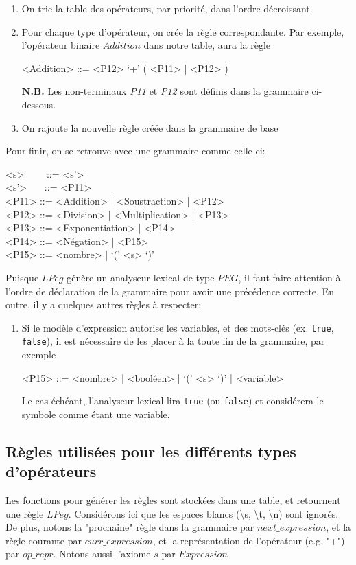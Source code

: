 \documentclass{article}
\begin{document}
\begin{enumerate}
	\item On trie la table des opérateurs, par priorité, dans l'ordre décroissant.
	\item Pour chaque type d'opérateur, on crée la règle correspondante. Par exemple, l'opérateur binaire $Addition$ dans notre table, aura la règle
	\begin{grammar}
		<Addition> ::= <P12> `+' ( <P11> | <P12> )
	\end{grammar}
	\textbf{N.B.} Les non-terminaux \textit{P11} et \textit{P12} sont définis dans la grammaire ci-dessous.
	\item On rajoute la nouvelle règle créée dans la grammaire de base
\end{enumerate}
Pour finir, on se retrouve avec une grammaire comme celle-ci:
\begin{grammar}
<s> \ \ \ \ ::= <s'>\\
<s'> \ \ \ ::= <P11>\\
<P11> ::= <Addition> | <Soustraction> | <P12>\\
<P12> ::= <Division> | <Multiplication> | <P13>\\
<P13> ::= <Exponentiation> | <P14>\\
<P14> ::= <Négation> | <P15>\\
<P15> ::= <nombre> | `(' <s> `)'
\end{grammar}
Puisque $LPeg$ génère un analyseur lexical de type $PEG$, il faut faire attention à l'ordre de déclaration de la grammaire pour avoir une précédence correcte. En outre, il y a quelques autres règles à respecter:
\begin{enumerate}
	\item Si le modèle d'expression autorise les variables, et des mots-clés (ex. \lstinline|true|, \lstinline|false|), il est nécessaire de les placer à la toute fin de la grammaire, par exemple
	\begin{grammar}
<P15> ::= <nombre> | <booléen> | `(' <s> `)' | <variable>
	\end{grammar}
	Le cas échéant, l'analyseur lexical lira \lstinline|true| (ou \lstinline|false|) et considérera le symbole comme étant une variable.
\end{enumerate}

\subsection{Règles utilisées pour les différents types d'opérateurs}
Les fonctions pour générer les règles sont stockées dans une table, et retournent une règle $LPeg$. Considérons ici que les espaces blancs (\textbackslash s, \textbackslash t, \textbackslash n) sont ignorés. De plus, notons la "prochaine" règle dans la grammaire par $next\_expression$, et la règle courante par $curr\_expression$, et la représentation de l'opérateur (e.g. "+") par $op\_repr$. Notons aussi l'axiome $s$ par $Expression$
\end{document}
